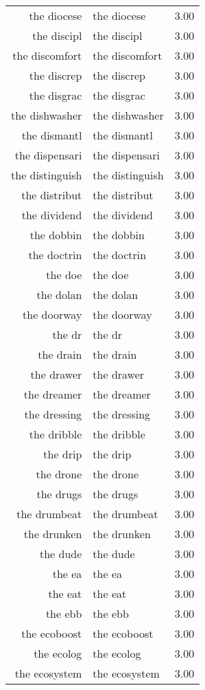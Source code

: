 \begin{table}[ht]
\begin{tabular}{rlr}
  the diocese & the diocese & 3.00 \\ 
  the discipl & the discipl & 3.00 \\ 
  the discomfort & the discomfort & 3.00 \\ 
  the discrep & the discrep & 3.00 \\ 
  the disgrac & the disgrac & 3.00 \\ 
  the dishwasher & the dishwasher & 3.00 \\ 
  the dismantl & the dismantl & 3.00 \\ 
  the dispensari & the dispensari & 3.00 \\ 
  the distinguish & the distinguish & 3.00 \\ 
  the distribut & the distribut & 3.00 \\ 
  the dividend & the dividend & 3.00 \\ 
  the dobbin & the dobbin & 3.00 \\ 
  the doctrin & the doctrin & 3.00 \\ 
  the doe & the doe & 3.00 \\ 
  the dolan & the dolan & 3.00 \\ 
  the doorway & the doorway & 3.00 \\ 
  the dr & the dr & 3.00 \\ 
  the drain & the drain & 3.00 \\ 
  the drawer & the drawer & 3.00 \\ 
  the dreamer & the dreamer & 3.00 \\ 
  the dressing & the dressing & 3.00 \\ 
  the dribble & the dribble & 3.00 \\ 
  the drip & the drip & 3.00 \\ 
  the drone & the drone & 3.00 \\ 
  the drugs & the drugs & 3.00 \\ 
  the drumbeat & the drumbeat & 3.00 \\ 
  the drunken & the drunken & 3.00 \\ 
  the dude & the dude & 3.00 \\ 
  the ea & the ea & 3.00 \\ 
  the eat & the eat & 3.00 \\ 
  the ebb & the ebb & 3.00 \\ 
  the ecoboost & the ecoboost & 3.00 \\ 
  the ecolog & the ecolog & 3.00 \\ 
  the ecosystem & the ecosystem & 3.00 \\ 

\end{tabular}
\end{table}

